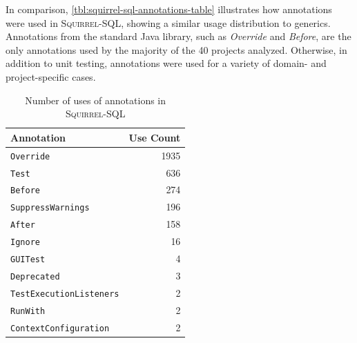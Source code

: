 \documentclass{svjour3}
\newcommand{\squirrelsql}{\textsc{Squirrel-SQL}\xspace}
\begin{document}
% 
% 
% 		

In comparison, \autoref{tbl:squirrel-sql-annotations-table} illustrates how annotations were used in \squirrelsql,
showing a similar usage distribution to generics.
Annotations from the standard Java library, such as \textit{Override} and \textit{Before}, 
are the only annotations used by the majority of the 40 projects analyzed.
Otherwise, in addition to unit testing, annotations were used for a variety of domain- and project-specific cases.

\begin{table}[htb]
\centering

\begin{tabular}{lr}
\toprule
\textbf{Annotation} & \textbf{Use Count} \\
\midrule 

\texttt{Override} & 	1935 \\
\texttt{Test} & 	636 \\
\texttt{Before} & 	274 \\
\texttt{SuppressWarnings} & 		196 \\
\texttt{After} & 	158 \\
\texttt{Ignore} & 	16 \\
\texttt{GUITest} & 	4 \\
\texttt{Deprecated} & 	3 \\
\texttt{TestExecutionListeners} &		2\\
\texttt{RunWith} &		2\\
\texttt{ContextConfiguration} &		2\\

\bottomrule
\end{tabular}
\caption{Number of uses of annotations in \squirrelsql}
\label{tbl:squirrel-sql-annotations-table}
\end{table}
\end{document}
